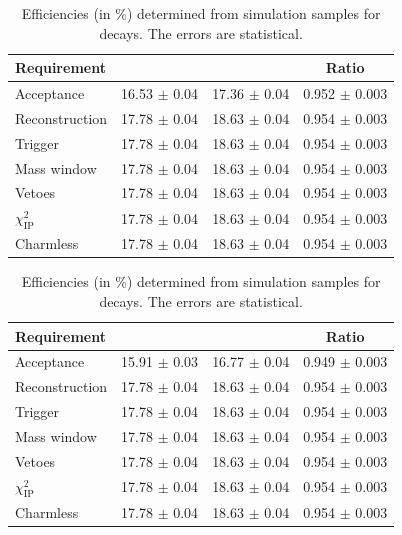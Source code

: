 \begin{table}[h]
\centering
\begin{tabular}{ l c c c }

\hline
Requirement             & \decay{\Bp}{\Dsp\phiz}   & \decay{\Bp}{\Dsp\Dzb} & Ratio \\ 
\hline
Acceptance              & 16.53 $\pm$ 0.04         & 17.36 $\pm$ 0.04      & 0.952 $\pm$ 0.003  \\
Reconstruction          & 17.78 $\pm$ 0.04         & 18.63 $\pm$ 0.04      & 0.954 $\pm$ 0.003  \\
Trigger                 & 17.78 $\pm$ 0.04         & 18.63 $\pm$ 0.04      & 0.954 $\pm$ 0.003  \\
Mass window             & 17.78 $\pm$ 0.04         & 18.63 $\pm$ 0.04      & 0.954 $\pm$ 0.003  \\
Vetoes                  & 17.78 $\pm$ 0.04         & 18.63 $\pm$ 0.04      & 0.954 $\pm$ 0.003  \\
$\chi^{2}_{\text{IP}}$  & 17.78 $\pm$ 0.04         & 18.63 $\pm$ 0.04      & 0.954 $\pm$ 0.003  \\
Charmless               & 17.78 $\pm$ 0.04         & 18.63 $\pm$ 0.04      & 0.954 $\pm$ 0.003  \\
\hline
\end{tabular}
\caption{Efficiencies (in \%) determined from simulation samples for \decay{\Dsp}{\Kp\pim\pip} decays.
The errors are statistical.} 
\label{tab:B2DsPhi_eff_KPiPi} 
\end{table}

\begin{table}[h]
\centering
\begin{tabular}{ l c c c }

\hline
Requirement             & \decay{\Bp}{\Dsp\phiz}   & \decay{\Bp}{\Dsp\Dzb} & Ratio \\ 
\hline
Acceptance              & 15.91 $\pm$ 0.03         & 16.77 $\pm$ 0.04      & 0.949 $\pm$ 0.003  \\
Reconstruction          & 17.78 $\pm$ 0.04         & 18.63 $\pm$ 0.04      & 0.954 $\pm$ 0.003  \\
Trigger                 & 17.78 $\pm$ 0.04         & 18.63 $\pm$ 0.04      & 0.954 $\pm$ 0.003  \\
Mass window             & 17.78 $\pm$ 0.04         & 18.63 $\pm$ 0.04      & 0.954 $\pm$ 0.003  \\
Vetoes                  & 17.78 $\pm$ 0.04         & 18.63 $\pm$ 0.04      & 0.954 $\pm$ 0.003  \\
$\chi^{2}_{\text{IP}}$  & 17.78 $\pm$ 0.04         & 18.63 $\pm$ 0.04      & 0.954 $\pm$ 0.003  \\
Charmless               & 17.78 $\pm$ 0.04         & 18.63 $\pm$ 0.04      & 0.954 $\pm$ 0.003  \\
\hline
\end{tabular}
\caption{Efficiencies (in \%) determined from simulation samples for \decay{\Dsp}{\pip\pim\pip} decays.
The errors are statistical.} 
\label{tab:B2DsPhi_eff_PiPiPi} 
\end{table}

